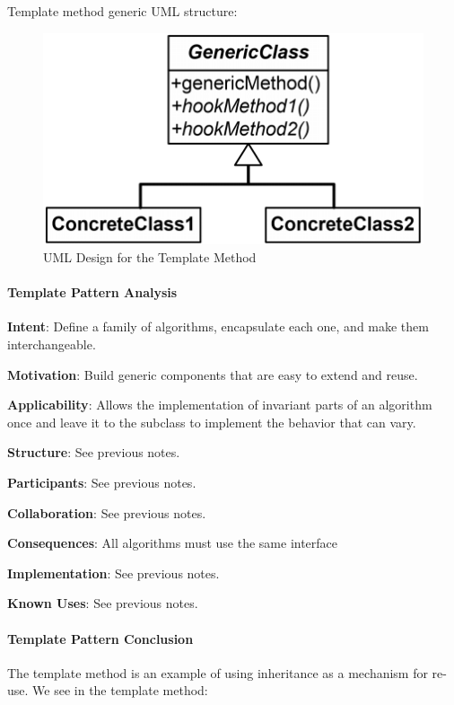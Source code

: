 \documentclass[]{article}
\let\oldparagraph\paragraph
\renewcommand{\paragraph}[1]{\oldparagraph{#1}\mbox{}}
\begin{document}
Template method generic UML structure:

\begin{figure}
\centering
\includegraphics{images/templateuml.png}
\caption{UML Design for the Template Method}
\end{figure}

\hypertarget{template-pattern-analysis}{%
\paragraph{Template Pattern Analysis}\label{template-pattern-analysis}}

\textbf{Intent}: Define a family of algorithms, encapsulate each one,
and make them interchangeable.

\textbf{Motivation}: Build generic components that are easy to extend
and reuse.

\textbf{Applicability}: Allows the implementation of invariant parts of
an algorithm once and leave it to the subclass to implement the behavior
that can vary.

\textbf{Structure}: See previous notes.

\textbf{Participants}: See previous notes.

\textbf{Collaboration}: See previous notes.

\textbf{Consequences}: All algorithms must use the same interface

\textbf{Implementation}: See previous notes.

\textbf{Known Uses}: See previous notes.

\hypertarget{template-pattern-conclusion}{%
\paragraph{Template Pattern
Conclusion}\label{template-pattern-conclusion}}

The template method is an example of using inheritance as a mechanism
for re-use. We see in the template method:
\end{document}
